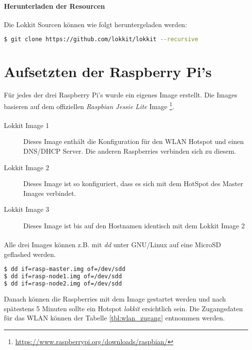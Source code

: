 \paragraph{Herunterladen der Resourcen}

Die Lokkit Sourcen können wie folgt heruntergeladen werden:

\begin{lstlisting}[language=bash]
$ git clone https://github.com/lokkit/lokkit --recursive
\end{lstlisting}

\section{Aufsetzten der Raspberry Pi's}
Für jedes der drei Raspberry Pi's wurde ein eigenes Image erstellt. Die Images basieren auf dem offiziellen \emph{Raspbian Jessie Lite} Image \footnote{\url{https://www.raspberrypi.org/downloads/raspbian/}}.

\paragraph{}
\begin{description}
    \item[Lokkit Image 1] Dieses Image enthält die Konfiguration für den WLAN Hotspot und einen DNS/DHCP Server. Die anderen Raspberries verbinden sich zu diesem.
    \item[Lokkit Image 2] Dieses Image ist so konfiguriert, dass es sich mit dem HotSpot des Master Images verbindet.
    \item[Lokkit Image 3] Dieses Image ist bis auf den Hostnamen identisch mit dem Lokkit Image 2
\end{description}

\paragraph{}
Alle drei Images können z.B. mit \emph{dd} unter GNU/Linux auf eine MicroSD geflashed werden. 

\begin{lstlisting}[language=bash,caption={Beispiel \emph{dd} unter GNU/Linux}]
$ dd if=rasp-master.img of=/dev/sdd
$ dd if=rasp-node1.img of=/dev/sdd
$ dd if=rasp-node2.img of=/dev/sdd
\end{lstlisting}

Danach können die Raspberries mit dem Image gestartet werden und nach spätestens 5 Minuten sollte ein Hotspot \emph{lokkit} ersichtlich sein. Die Zugangsdaten für das WLAN können der Tabelle \ref{tbl:wlan_zugang} entnommen werden.  

